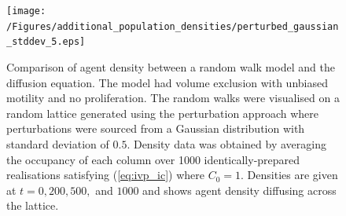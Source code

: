 \documentclass[11pt,titlepage,a4paper]{article}
\begin{document}
\begin{appendix}
		\begin{figure}[tbh]
			\centering
				\texttt{[image: /Figures/additional\_population\_densities/perturbed\_gaussian\_stddev\_5.eps]}
			\caption{Comparison of agent density between a random walk model and the diffusion equation. The model had volume exclusion with unbiased motility and no proliferation. The random walks were visualised on a random lattice generated using the perturbation approach where perturbations were sourced from a Gaussian distribution with standard deviation of $0.5$. Density data was obtained by averaging the occupancy of each column over 1000 identically-prepared realisations satisfying (\ref{eq:ivp_ic}) where $C_0 = 1$. Densities are given at $t = 0, 200, 500,$ and $1000$ and shows agent density diffusing across the lattice.}
			\label{fig:perturbed_gaussian_stddev_5}
		\end{figure}

\end{appendix}
\end{document}
